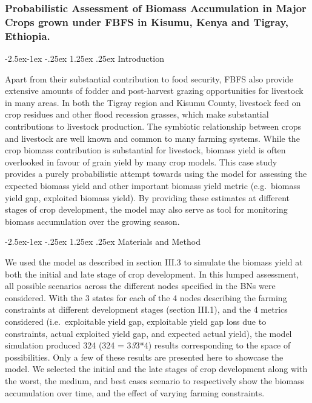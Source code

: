 \documentclass[12pt,oneside]{article}
\makeatletter
\renewcommand\paragraph{\@startsection{paragraph}{4}{\z@}%
            {-2.5ex\@plus -1ex \@minus -.25ex}%
            {1.25ex \@plus .25ex}%
            {\normalfont\normalsize\bfseries}}
\makeatother
\begin{document}
\hypertarget{probabilistic-assessment-of-biomass-accumulation-in-major-crops-grown-under-fbfs-in-kisumu-kenya-and-tigray-ethiopia.}{%
\subsubsection{Probabilistic Assessment of Biomass Accumulation in Major
Crops grown under FBFS in Kisumu, Kenya and Tigray,
Ethiopia.}\label{probabilistic-assessment-of-biomass-accumulation-in-major-crops-grown-under-fbfs-in-kisumu-kenya-and-tigray-ethiopia.}}

\hypertarget{introduction-2}{%
\paragraph{Introduction}\label{introduction-2}}

Apart from their substantial contribution to food security, FBFS also
provide extensive amounts of fodder and post-harvest grazing
opportunities for livestock in many areas. In both the Tigray region and
Kisumu County, livestock feed on crop residues and other flood recession
grasses, which make substantial contributions to livestock production.
The symbiotic relationship between crops and livestock are well known
and common to many farming systems. While the crop biomass contribution
is substantial for livestock, biomass yield is often overlooked in
favour of grain yield by many crop models. This case study provides a
purely probabilistic attempt towards using the model for assessing the
expected biomass yield and other important biomass yield metric
(e.g.~biomass yield gap, exploited biomass yield). By providing these
estimates at different stages of crop development, the model may also
serve as tool for monitoring biomass accumulation over the growing
season.

\hypertarget{materials-and-method-1}{%
\paragraph{Materials and Method}\label{materials-and-method-1}}

We used the model as described in section III.3 to simulate the biomass
yield at both the initial and late stage of crop development. In this
lumped assessment, all possible scenarios across the different nodes
specified in the BNs were considered. With the 3 states for each of the
4 nodes describing the farming constraints at different development
stages (section III.1), and the 4 metrics considered (i.e.~exploitable
yield gap, exploitable yield gap loss due to constraints, actual
exploited yield gap, and expected actual yield), the model simulation
produced 324 (324 = 3\emph{3}3*4) results corresponding to the space of
possibilities. Only a few of these results are presented here to
showcase the model. We selected the initial and the late stages of crop
development along with the worst, the medium, and best cases scenario to
respectively show the biomass accumulation over time, and the effect of
varying farming constraints.
\end{document}
